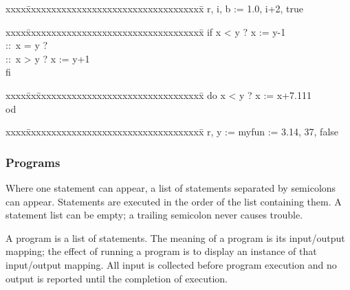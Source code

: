 \begin{tt}
\begin{tabbing}
xxxx\=xxxxxxxxxxxxxxxxxxxxxxxxxxxxxxxxxxx\=\kill
\>r, i, b := 1.0, i+2, true
\end{tabbing}
\end{tt}


\begin{tt}
\begin{tabbing}
xxxx\=xxxxxxxxxxxxxxxxxxxxxxxxxxxxxxxxxxx\=\kill
\>if x < y  ? x := y-1  \\
\>::\ x = y ?           \\
\>::\ x > y ? x := y+1  \\
\>fi
\end{tabbing}
\end{tt}


\begin{tt}
\begin{tabbing}
xxxx\=xx\=xxxxxxxxxxxxxxxxxxxxxxxxxxxxxxxxx\=\kill
\>do x < y ? x := x+7.111  \\
\>od                       \\
\end{tabbing}
\end{tt}


\begin{tt}
\begin{tabbing}
xxxx\=xxxxxxxxxxxxxxxxxxxxxxxxxxxxxxxxxxx\=\kill
\>r, y := myfun := 3.14, 37, false
\end{tabbing}
\end{tt}

\subsubsection{Programs}

Where one statement can appear, a list of statements separated by 
semicolons can appear.  
Statements are executed in the order of the list containing them.  
A statement list can be empty; a trailing semicolon never causes trouble.

A program is a list of statements.  The meaning of a program is its 
input/output mapping; the effect of running a program is to display an 
instance of that input/output mapping.  
All input is collected before program execution and no output is 
reported until the completion of execution.

